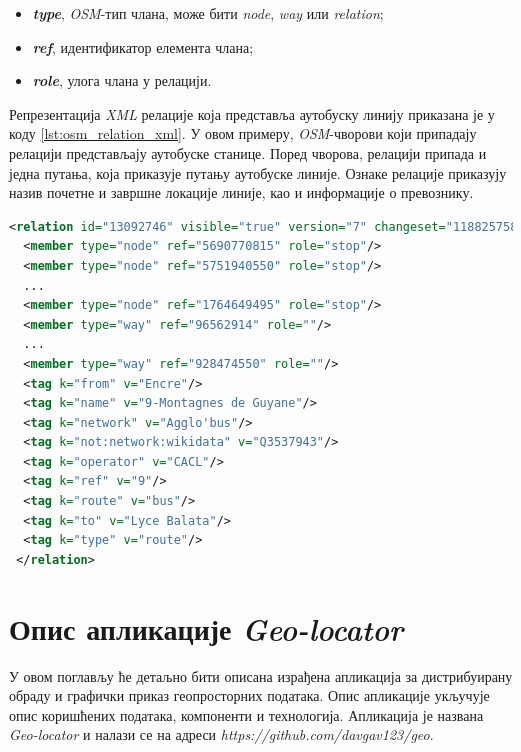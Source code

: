 \documentclass[12pt,oneside]{memoir}
\begin{document}
\begin{itemize}
	\item \textbf{\textit{type}}, \textit{OSM}-тип члана, може бити \textit{node}, \textit{way} или \textit{relation};
	\item \textbf{\textit{ref}}, идентификатор елемента члана;
	\item \textbf{\textit{role}}, улога члана у релацији.
\end{itemize}

Репрезентација \textit{XML} релације која представља аутобуску линију приказана је у коду \ref{lst:osm_relation_xml}. У овом примеру, \textit{OSM}-чворови који припадају релацији представљају аутобуске станице. Поред чворова, релацији припада и једна путања, која приказује путању аутобуске линије. Ознаке релације приказују назив почетне и завршне локације линије, као и информације о превознику.

\begin{lstlisting}[language=XML, caption={Запис \textit{XML} \textit{OSM}-релације која представља аутобуску линију}, label={lst:osm_relation_xml}]
<relation id="13092746" visible="true" version="7" changeset="118825758" timestamp="2022-03-23T15:05:48Z" user="" uid="">
  <member type="node" ref="5690770815" role="stop"/>
  <member type="node" ref="5751940550" role="stop"/>
  ...
  <member type="node" ref="1764649495" role="stop"/>
  <member type="way" ref="96562914" role=""/>
  ...
  <member type="way" ref="928474550" role=""/>
  <tag k="from" v="Encre"/>
  <tag k="name" v="9-Montagnes de Guyane"/>
  <tag k="network" v="Agglo'bus"/>
  <tag k="not:network:wikidata" v="Q3537943"/>
  <tag k="operator" v="CACL"/>
  <tag k="ref" v="9"/>
  <tag k="route" v="bus"/>
  <tag k="to" v="Lyce Balata"/>
  <tag k="type" v="route"/>
 </relation>
\end{lstlisting}


\chapter{Опис апликације \textit{Geo-locator}}
\label{chp:app}

У овом поглављу ће детаљно бити описана израђена апликација за дистрибуирану обраду и графички приказ геопросторних података. Опис апликације укључује опис коришћених података, компоненти и технологија. Апликација је названа \textit{Geo-locator} и налази се на адреси \textit{https://github.com/davgav123/geo}.
\end{document}
